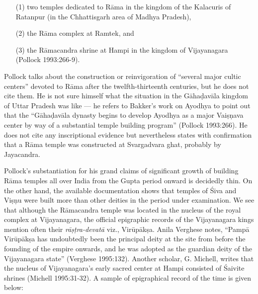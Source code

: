 \begin{itemize}
\item[(1)] two temples dedicated to Rāma in the kingdom of the Kalacuris of Ratanpur (in the Chhattisgarh area of Madhya Pradesh), 

\item[(2)] the Rāma complex at Ramtek, and 

\item[(3)] the Rāmacandra shrine at Hampi in the kingdom of Vijayanagara  (Pollock 1993:266-9). 
\end{itemize}

Pollock talks about the construction or reinvigoration of “several major cultic centers” devoted to Rāma after the twelfth-thirteenth centuries, but he does not cite them. He is not sure himself what the situation in the Gāhaḍavāla kingdom of Uttar Pradesh was like — he refers to Bakker’s work on Ayodhya to point out that the “Gāhaḍavāla dynasty begins to develop Ayodhya as a major Vaiṣṇava center by way of a substantial temple building program” (Pollock 1993:266). He does not cite any inscriptional evidence but nevertheless states with confirmation that a Rāma temple was constructed at Svargadvara ghat, probably by Jayacandra. 

Pollock’s substantiation for his grand claims of significant growth of building Rāma temples all over India from the Gupta period onward is decidedly thin. On the other hand, the available documentation shows that temples of Śiva and Viṣṇu were built more than other deities in the period under examination. We see that although the Rāmacandra temple was located in the nucleus of the royal complex at Vijayanagara, the official epigraphic records of the Vijayanagara kings mention often their {\sl rāṣṭra-devatā} viz., Virūpākṣa. Anila Verghese notes, “Pampā Virūpākṣa has undoubtedly been the principal deity at the site from before the founding of the empire onwards, and he was adopted as the guardian deity of the Vijayanagara state” (Verghese 1995:132). Another scholar, G. Michell, writes that the nucleus of Vijayanagara’s early sacred center at Hampi consisted of Śaivite shrines (Michell 1995:31-32). A sample of epigraphical record of the time is given below:

